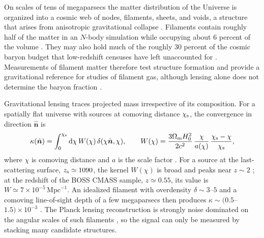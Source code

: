 \documentclass[11pt,letterpaper]{article}
\begin{document}
\label{sec:intro}

On scales of tens of megaparsecs the matter distribution of the Universe is
organized into a cosmic web of nodes, filaments, sheets, and voids, a
structure that arises from anisotropic gravitational collapse
\citep{Zeldovich1970, BondKofmanPogosyan1996}. Filaments contain roughly half
of the matter in an $N$-body simulation while occupying about 6 percent of
the volume \citep{Cautun2014}. They may also hold much of the roughly 30
percent of the cosmic baryon budget that low-redshift censuses have left
unaccounted for \citep{FukugitaHoganPeebles1998, Shull2012, CenOstriker1999}.
Measurements of filament matter therefore test structure formation and
provide a gravitational reference for studies of filament gas, although
lensing alone does not determine the baryon fraction
\citep{deGraaff2019, Tanimura2020, Nicastro2018}.

Gravitational lensing traces projected mass irrespective of its composition.
For a spatially flat universe with sources at comoving distance $\chi_{\rm s}$,
the convergence in direction $\hat{\boldsymbol n}$ is
\begin{equation}
  \kappa(\hat{\boldsymbol n}) = \int_{0}^{\chi_{\rm s}} \mathrm{d}\chi\,
  W(\chi)\,\delta(\chi\hat{\boldsymbol n},\chi), \qquad
  W(\chi) = \frac{3\Omega_{\rm m}H_{0}^{2}}{2c^{2}}\,
  \frac{\chi}{a(\chi)}\,\frac{\chi_{\rm s}-\chi}{\chi_{\rm s}},
  \label{eq:kappa}
\end{equation}
where $\chi$ is comoving distance and $a$ is the scale factor
\citep{Bartelmann2001}. For a source at the last-scattering surface,
$z_{\rm s}\simeq1090$, the kernel $W(\chi)$ is broad and peaks near $z\sim2$
\citep{LewisChallinor2006}; at the redshift of the BOSS CMASS sample,
$z\simeq0.55$, its value is $W\simeq7\times10^{-5}\,\mathrm{Mpc}^{-1}$.
An idealized filament with overdensity $\delta\sim3$--$5$ and a comoving
line-of-sight depth of a few megaparsecs then produces
$\kappa\sim(0.5$--$1.5)\times10^{-3}$ \citep{Colberg2005}. The Planck lensing
reconstruction is strongly noise dominated on the angular scales of such
filaments \citep{Planck2018lensing}, so the signal can only be measured by
stacking many candidate structures.
\end{document}
